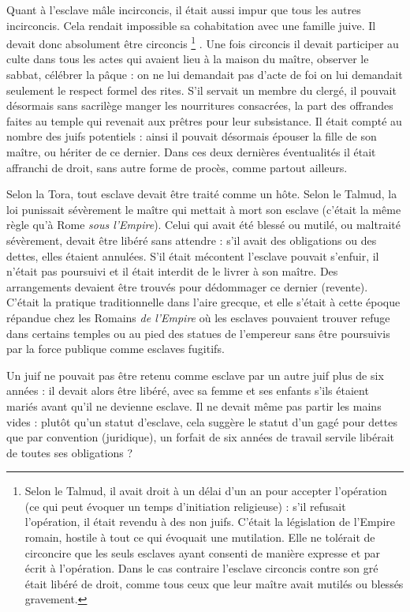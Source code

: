  Quant à l'esclave mâle incirconcis, il était aussi impur que tous les autres incirconcis. Cela rendait impossible sa cohabitation avec une famille juive. Il devait donc absolument être circoncis%
\footnote{Selon le Talmud, il avait droit à un délai d'un an pour accepter l'opération (ce qui peut évoquer un temps d'initiation religieuse) : s'il refusait l'opération, il était revendu à des non juifs. C'était la législation de l'Empire romain, hostile à tout ce qui évoquait une mutilation. Elle ne tolérait de circoncire que les seuls esclaves ayant consenti de manière expresse et par écrit à l'opération. Dans le cas contraire l'esclave circoncis contre son gré était libéré de droit, comme tous ceux que leur maître avait mutilés ou blessés gravement.}%
. Une fois circoncis il devait participer au culte dans tous les actes qui avaient lieu à la maison du maître, observer le sabbat, célébrer la pâque : on ne lui demandait pas d'acte de foi on lui demandait seulement le respect formel des rites. S'il servait un membre du clergé, il pouvait désormais sans sacrilège manger les nourritures consacrées, la part des offrandes faites au temple qui revenait aux prêtres pour leur subsistance. Il était compté au nombre des juifs potentiels : ainsi il pouvait désormais épouser la fille de son maître, ou hériter de ce dernier. Dans ces deux dernières éventualités il était affranchi de droit, sans autre forme de procès, comme partout ailleurs.

 Selon la Tora, tout esclave devait être traité comme un hôte. Selon le Talmud, la loi punissait sévèrement le maître qui mettait à mort son esclave (c'était la même règle qu'à Rome \emph{sous l'Empire}). Celui qui avait été blessé ou mutilé, ou maltraité sévèrement, devait être libéré sans attendre : s'il avait des obligations ou des dettes, elles étaient annulées. S'il était mécontent l'esclave pouvait s'enfuir, il n'était pas poursuivi et il était interdit de le livrer à son maître. Des arrangements devaient être trouvés pour dédommager ce dernier (revente). C'était la pratique traditionnelle dans l'aire grecque, et elle s'était à cette époque répandue chez les Romains \emph{de l'Empire} où les esclaves pouvaient trouver refuge dans certains temples ou au pied des statues de l'empereur sans être poursuivis par la force publique comme esclaves fugitifs.

 Un juif ne pouvait pas être retenu comme esclave par un autre juif plus de six années : il devait alors être libéré, avec sa femme et ses enfants s'ils étaient mariés avant qu'il ne devienne esclave. Il ne devait même pas partir les mains vides : plutôt qu'un statut d'esclave, cela suggère le statut d'un gagé pour dettes que par convention (juridique), un forfait de six années de travail servile libérait de toutes ses obligations ?

